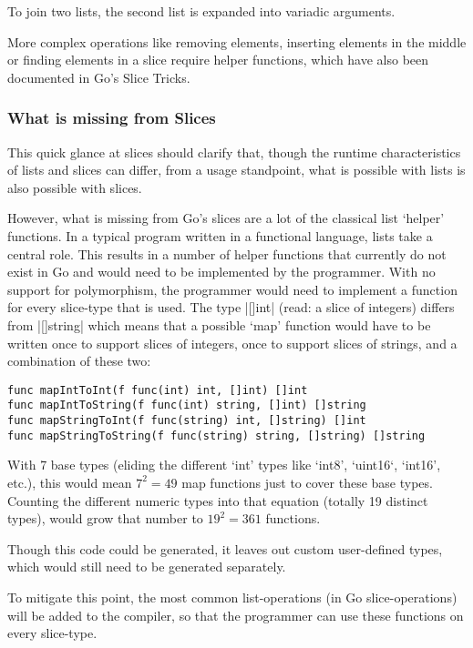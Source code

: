 To join two lists, the second list is expanded into
variadic arguments.

More complex operations like removing elements, inserting elements in the middle or finding
elements in a slice require helper functions, which have also been documented in Go's
Slice Tricks\autocite{slice-tricks}.

\subsubsection{What is missing from Slices}

This quick glance at slices should clarify that, though the runtime characteristics of lists and slices
can differ, from a usage standpoint, what is possible with lists is also possible with slices.

However, what is missing from Go's slices are a lot of the classical list `helper' functions. In a typical program written in a functional
language, lists take a central role. This results in a number of helper functions\autocite{haskell-list-funcs}
that currently do not exist in Go and would need to be implemented by the programmer.
With no support for polymorphism, the programmer would need to implement a function for every slice-type
that is used. The type
|[]int|
(read: a slice of integers) differs from
|[]string|
which means that a possible `map' function would have to be
written once to support slices of integers, once to support slices of strings, and a combination of these two:

\begin{verbatim}
func mapIntToInt(f func(int) int, []int) []int
func mapIntToString(f func(int) string, []int) []string
func mapStringToInt(f func(string) int, []string) []int
func mapStringToString(f func(string) string, []string) []string
\end{verbatim}

With 7 base types (eliding the different `int' types like `int8', `uint16`, `int16', etc.), this would
mean $7^{2} = 49$ map functions just to cover these base types. Counting the different numeric
types into that equation (totally 19 distinct types\autocite{go-basetypes}), would grow that number to $19^{2} = 361$ functions.

Though this code could be generated, it leaves out custom user-defined types, which would still
need to be generated separately.

To mitigate this point, the most common list-operations (in Go slice-operations) will be added to
the compiler, so that the programmer can use these functions on every slice-type.

